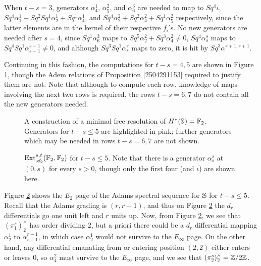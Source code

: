 \documentclass[11pt, titlepage]{article} %
\def\bb{\ensuremath\mathbb}
\def\inte{\ensuremath\mathbb{Z}}
\def\A{\ensuremath{\mathscr{A}_2}}
\DeclareMathOperator{\Ext}{Ext}
\numberwithin{equation}{subsection}
\theoremstyle{plain}
\theoremstyle{definition}
\begin{document}
When \(t-s=3\), generators \(\alpha^1_4\), \(\alpha^2_5\), and \(\alpha^3_6\) are needed to map to \(Sq^4\iota\), \(Sq^4\alpha^1_1+Sq^2Sq^1\alpha^1_2+Sq^1 \alpha^1_4\), and \(Sq^4\alpha^2_2+Sq^2\alpha^2_4+Sq^1\alpha^2_5\) respectively, since the latter elements are in the kernel of their respective \(f_i\)'s. No new generators are needed after \(s=4\), since \(Sq^1\alpha^3_6\) maps to \(Sq^5\alpha^2_2+Sq^3\alpha^2_4\neq 0\), \(Sq^4\alpha^s_s\) maps to \(Sq^4Sq^1\alpha^{s-1}_{s-1}\neq 0\), and although \(Sq^3Sq^1\alpha^s_s\) maps to zero, it is hit by \(Sq^3\alpha^{s+1,s+1}\). 

Continuing in this fashion, the computations for \(t-s=4,5\) are shown in Figure \ref{2504201106}, though the Adem relations of Proposition \ref{2504291153} required to justify them are not. Note that although to compute each row, knowledge of maps involving the next two rows is required, the rows \(t-s=6,7\) do not contain all the new generators needed. 

\begin{figure}
\centering

\caption{A construction of a minimal free resolution of \(H^*(\bb{S})=\bb{F}_2\). Generators for \(t-s\leq5\) are highlighted in pink; further generators which may be needed in rows \(t-s=6, 7\) are not shown.}\label{2504201106}
\end{figure}

\begin{figure}
\centering

\caption{\(\Ext^{s,t}_{\A}(\bb{F}_2, \bb{F}_2)\) for \(t-s\leq 5\). Note that there is a generator \(\alpha^s_s\) at \((0,s)\) for every \(s> 0\), though only the first four (and \(\iota\)) are shown here.}
\label{2504241018}
\end{figure}

Figure \ref{2504241018} shows the \(E_2\) page of the Adams spectral sequence for \(\bb{S}\) for \(t-s\leq 5\). Recall that the Adams grading is \((r, r-1)\), and thus on Figure \ref{2504241018} the \(d_r\) differentials go one unit left and \(r\) units up. Now, from Figure \ref{2504241018}, we see that \((\pi_1^s)^\wedge_2\) has order dividing 2, but a priori there could be a \(d_r\) differential mapping \(\alpha^1_2\) to \(\alpha^{r+1}_{r+1}\), in which case \(\alpha^1_2\) would not survive to the \(E_\infty\) page. On the other hand, any differential emanating from or entering position \((2,2)\) either enters or leaves 0, so \(\alpha^2_4\) must survive to the \(E_\infty\) page, and we see that \((\pi_2^s)^\wedge_2=\inte/2\inte\). 
\end{document}
